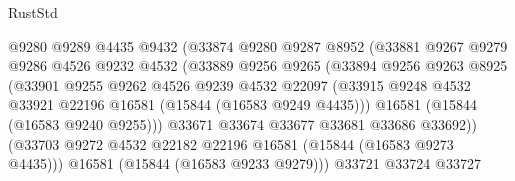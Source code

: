 \begin{lexlean}{RustStd}
\begin{coremodule}
                                @9280
                                @9289
                                @4435
                                @9432
                                (@33874
                                  @9280
                                  @9287
                                  @8952
                                  (@33881
                                    @9267
                                    @9279
                                    @9286
                                    @4526
                                    @9232
                                    @4532
                                    (@33889
                                      @9256
                                      @9265
                                      (@33894
                                        @9256
                                        @9263
                                        @8925
                                        (@33901
                                          @9255
                                          @9262
                                          @4526
                                          @9239
                                          @4532
                                          @22097
                                          (@33915
                                            @9248
                                            @4532
                                            @33921
                                            @22196
                                            @16581
                                            (@15844 (@16583 @9249 @4435)))
                                          @16581
                                          (@15844 (@16583 @9240 @9255)))
                                        @33671
                                        @33674
                                        @33677
                                        @33681
                                        @33686
                                        @33692))
                                    (@33703
                                      @9272
                                      @4532
                                      @22182
                                      @22196
                                      @16581
                                      (@15844 (@16583 @9273 @4435)))
                                    @16581
                                    (@15844 (@16583 @9233 @9279)))
                                  @33721
                                  @33724
                                  @33727

\end{coremodule}
\end{lexlean}
